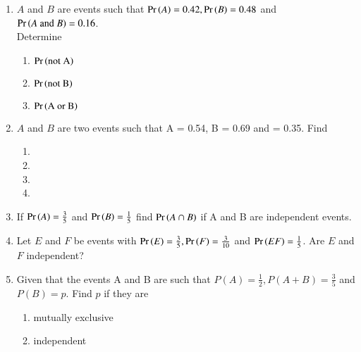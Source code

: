 \begin{enumerate}[label=\thesubsection.\arabic*,ref=\thesubsection.\theenumi]
	\vspace{-5mm}
\begin{multicols}{4}
\begin{enumerate}
\item $\frac{4}{15}$ 
\item $\frac{8}{45}$
\item $\frac{1}{3}$
\item $\frac{2}{9}$
\end{enumerate}
\end{multicols}
	\vspace{-5mm}
		\solution
		 
%
	\item $A$ and $B$ are events such that $\Pr\left(A\right)=0.42, \Pr\left(B\right)=0.48$ and $\Pr\left(A \text{ and } B\right)=0.16$. \\
Determine 
\begin{enumerate}
\item $\Pr\left(\text{not A}\right)$ 
\item $\Pr\left(\text{not B}\right)$  
\item $\Pr\left(\text{A or B}\right)$ 
\end{enumerate}
\solution

\item $A$ and $B$ are two events such that \pr A = 0.54, \pr B = 0.69 and  = 0.35.
%
Find 
	\vspace{-3mm}
\begin{multicols}{4}
	\begin{enumerate}
\item {}
\item {}
\item {}
\item {} 
\end{enumerate} 
\end{multicols}
	\vspace{-3mm}
		\solution

\item If $\Pr\left(A\right) = \frac{3}{5}$ and $\Pr\left(B\right) = \frac{1}{5}$ find $\Pr\left(A \cap B\right)$ if A and B are independent events.
	\\
\solution

%
\item   Let $E$ and $F$ be events with $\Pr\left(E\right)=\frac{3}{5}, \Pr\left(F\right)=\frac{3}{10}$ and $\Pr\left(E F\right)=\frac{1}{5}$. Are $E$ and $F$ independent?
	\\
\solution

\item Given that the events A and B are such that $P(A)=\frac{1}{2}, P(A + B)=\frac{3}{5}$ and $P(B)=p$. Find $p$ if they are 
\begin{enumerate}
\item mutually exclusive
\item independent
\end{enumerate}
\solution



\end{enumerate}
